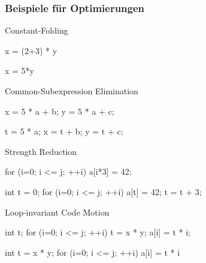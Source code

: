 \subsubsection*{Beispiele für Optimierungen}
Constant-Folding\\
\begin{minipage}{0.5\textwidth}
	\begin{codeBlock}{}
		x = (2+3) * y
	\end{codeBlock}
\end{minipage}
\begin{minipage}{0.5\textwidth}
	\begin{codeBlock}{}
		x = 5*y
	\end{codeBlock}
\end{minipage}

Common-Subexpression Elimination\\
\begin{minipage}{0.5\textwidth}
	\begin{codeBlock}{}
		x = 5 * a + b;
		y = 5 * a + c;
	\end{codeBlock}
\end{minipage}
\begin{minipage}{0.5\textwidth}
    \begin{codeBlock}{}
    	t = 5 * a;
    	x = t + b;
    	y = t + c;
    \end{codeBlock}
\end{minipage}
Strength Reduction\\
\begin{minipage}{0.5\textwidth}
    \begin{codeBlock}{}
    	for (i=0; i <= j; ++i){
    		a[i*3] = 42;
    	}
    \end{codeBlock}
\end{minipage}
\begin{minipage}{0.5\textwidth}
    \begin{codeBlock}{}
    	int t = 0;
    	for (i=0; i <= j; ++i){
    		a[t] = 42;
    		t = t + 3;
    	}
    \end{codeBlock}
\end{minipage}
Loop-invariant Code Motion\\
\begin{minipage}{0.5\textwidth}
    \begin{codeBlock}{}
    	int t;
    	for (i=0; i <= j; ++i){
    		t = x * y;
    		a[i] = t * i;	
    	}
    \end{codeBlock}
\end{minipage}
\begin{minipage}{0.5\textwidth}
	\begin{codeBlock}{}
		int t = x * y;
		for (i=0; i <= j; ++i){
			a[i] = t * i
		}
	\end{codeBlock}
\end{minipage}
